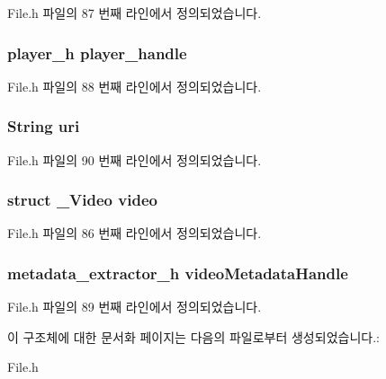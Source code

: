 File.\-h 파일의 87 번째 라인에서 정의되었습니다.

\hypertarget{struct___video_extends_acdbf0738be9fa70a60412d48cad881ee}{
\subsubsection[{player\-\_\-handle}]{\setlength{\rightskip}{0pt plus 5cm}player\-\_\-h player\-\_\-handle}}\label{struct___video_extends_acdbf0738be9fa70a60412d48cad881ee}


File.\-h 파일의 88 번째 라인에서 정의되었습니다.

\hypertarget{struct___video_extends_ac0b02717b928a36338653c49b0821365}{
\subsubsection[{uri}]{\setlength{\rightskip}{0pt plus 5cm}String uri}}\label{struct___video_extends_ac0b02717b928a36338653c49b0821365}


File.\-h 파일의 90 번째 라인에서 정의되었습니다.

\hypertarget{struct___video_extends_aa5784e2c1293cd9248e7bd28183fc1f8}{
\subsubsection[{video}]{\setlength{\rightskip}{0pt plus 5cm}struct {\bf \-\_\-\-Video} video}}\label{struct___video_extends_aa5784e2c1293cd9248e7bd28183fc1f8}


File.\-h 파일의 86 번째 라인에서 정의되었습니다.

\hypertarget{struct___video_extends_a0c761970ca029f0974eadbb58090641c}{
\subsubsection[{video\-Metadata\-Handle}]{\setlength{\rightskip}{0pt plus 5cm}metadata\-\_\-extractor\-\_\-h video\-Metadata\-Handle}}\label{struct___video_extends_a0c761970ca029f0974eadbb58090641c}


File.\-h 파일의 89 번째 라인에서 정의되었습니다.



이 구조체에 대한 문서화 페이지는 다음의 파일로부터 생성되었습니다.\-:\begin{DoxyCompactItemize}
\item 
File.\-h\end{DoxyCompactItemize}
